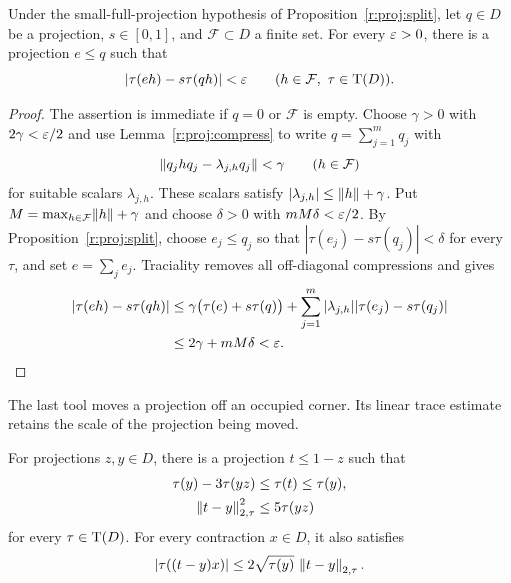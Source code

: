 \begin{corollary}\label{r:proj:tests}
Under the small-full-projection hypothesis of Proposition~\ref{r:proj:split},
let $q\in D$ be a projection, $s\in[0,1]$, and $\mathcal F\subset D$ a
finite set.  For every $\varepsilon>0$, there is a projection $e\le q$ such that
\begin{equation}\label{r:proj:tests-estimate}
  |\tau(eh)-s\tau(qh)|<\varepsilon
  \qquad(h\in\mathcal F,\ \tau\in\operatorname T(D)).
\end{equation}
\end{corollary}

\begin{proof}
The assertion is immediate if $q=0$ or $\mathcal F$ is empty.  Choose
$\gamma>0$ with $2\gamma<\varepsilon/2$ and use
Lemma~\ref{r:proj:compress} to write $q=\sum_{j=1}^m q_j$ with
\[
  \lVert q_j hq_j-\lambda_{j,h}q_j\rVert<\gamma
  \qquad(h\in\mathcal F)
\]
for suitable scalars $\lambda_{j,h}$.  These scalars satisfy
$|\lambda_{j,h}|\le\lVert h\rVert+\gamma$.
Put $M=\max_{h\in\mathcal F}\lVert h\rVert+\gamma$ and choose
$\delta>0$ with $mM\delta<\varepsilon/2$.
By Proposition~\ref{r:proj:split}, choose $e_j\le q_j$ so that
$|\tau(e_j)-s\tau(q_j)|<\delta$ for every $\tau$, and set
$e=\sum_j e_j$.  Traciality removes all off-diagonal compressions and gives
\begin{align*}
  |\tau(eh)-s\tau(qh)|
  &\le \gamma\bigl(\tau(e)+s\tau(q)\bigr)
       +\sum_{j=1}^m |\lambda_{j,h}|
          |\tau(e_j)-s\tau(q_j)| \\
  &\le 2\gamma+mM\delta<\varepsilon.
\end{align*}
\end{proof}

The last tool moves a projection off an occupied corner.  Its linear
trace estimate retains the scale of the projection being moved.

\begin{lemma}\label{r:proj:move}
For projections $z,y\in D$, there is a projection $t\le1-z$ such that
\begin{align}
  \tau(y)-3\tau(yz)&\le\tau(t)\le\tau(y),
       \label{r:proj:move-mass}\\
  \left\|t-y\right\|_{2,\tau}^{2}&\le5\tau(yz)
       \label{r:proj:move-distance}
\end{align}
for every $\tau\in\operatorname T(D)$.  For every contraction $x\in D$, it also
satisfies
\begin{equation}\label{r:proj:move-linear}
  |\tau((t-y)x)|
   \le2\sqrt{\tau(y)}\,\left\|t-y\right\|_{2,\tau}.
\end{equation}
\end{lemma}

